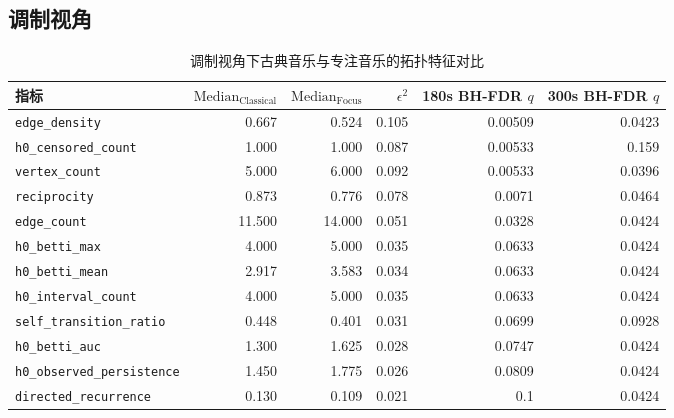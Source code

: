 \documentclass{article}
\begin{document}
\clearpage
\subsection{调制视角}

\begin{table}[htbp]
\centering
\caption{调制视角下古典音乐与专注音乐的拓扑特征对比}
\label{tab:modulation_topology}
\begin{tabular}{lrrrrr}
\toprule
指标                    & $\text{Median}_{\text{Classical}}$ & $\text{Median}_{\text{Focus}}$ & $\epsilon^2$ & 180s BH-FDR $q$ & 300s BH-FDR $q$ \\
\midrule
\rowcolor{green!15}\verb|edge_density|            &            0.667 &             0.524 &        0.105 &    0.00509 &    0.0423 \\
\rowcolor{orange!15}\verb|h0_censored_count|       &            1.000 &             1.000 &        0.087 &    0.00533 &     0.159 \\
\rowcolor{green!15}\verb|vertex_count|            &            5.000 &             6.000 &        0.092 &    0.00533 &    0.0396 \\
\rowcolor{green!15}\verb|reciprocity|             &            0.873 &             0.776 &        0.078 &     0.0071 &    0.0464 \\
\rowcolor{green!15}\verb|edge_count|              &           11.500 &            14.000 &        0.051 &    0.0328 &    0.0424 \\
\rowcolor{orange!15}\verb|h0_betti_max|            &            4.000 &             5.000 &        0.035 &    0.0633 &    0.0424 \\
\rowcolor{orange!15}\verb|h0_betti_mean|           &            2.917 &             3.583 &        0.034 &    0.0633 &    0.0424 \\
\rowcolor{orange!15}\verb|h0_interval_count|       &            4.000 &             5.000 &        0.035 &    0.0633 &    0.0424 \\
\verb|self_transition_ratio|   &            0.448 &             0.401 &        0.031 &    0.0699 &    0.0928 \\
\rowcolor{orange!15}\verb|h0_betti_auc|            &            1.300 &             1.625 &        0.028 &    0.0747 &    0.0424 \\
\rowcolor{orange!15}\verb|h0_observed_persistence| &            1.450 &             1.775 &        0.026 &    0.0809 &    0.0424 \\
\rowcolor{orange!15}\verb|directed_recurrence|     &            0.130 &             0.109 &        0.021 &      0.1 &    0.0424 \\

\end{tabular}
\end{table}
\end{document}
